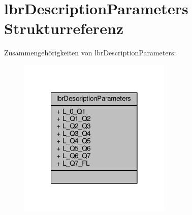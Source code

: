 \hypertarget{structlbrDescriptionParameters}{\section{lbr\-Description\-Parameters Strukturreferenz}
\label{structlbrDescriptionParameters}
}


Zusammengehörigkeiten von lbr\-Description\-Parameters\-:
\nopagebreak
\begin{figure}[H]
\begin{center}
\leavevmode
\includegraphics[width=206pt]{structlbrDescriptionParameters__coll__graph}
\end{center}
\end{figure}
